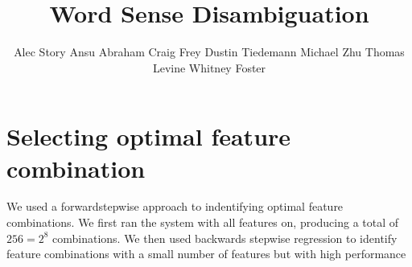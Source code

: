 \documentclass{article}
\title{Word Sense Disambiguation}
\author{
Alec Story
Ansu Abraham
Craig Frey
Dustin Tiedemann
Michael Zhu
Thomas Levine
Whitney Foster
}
\begin{document}
\maketitle


\section{Selecting optimal feature combination}
\newcommand\ward{forward} %
We used a \ward stepwise approach to indentifying optimal feature combinations.
We first ran the system with all features on, producing a total of $256=2^8$ combinations.
We then used backwards stepwise regression to identify feature combinations
with a small number of features but with high performance
\end{document}
